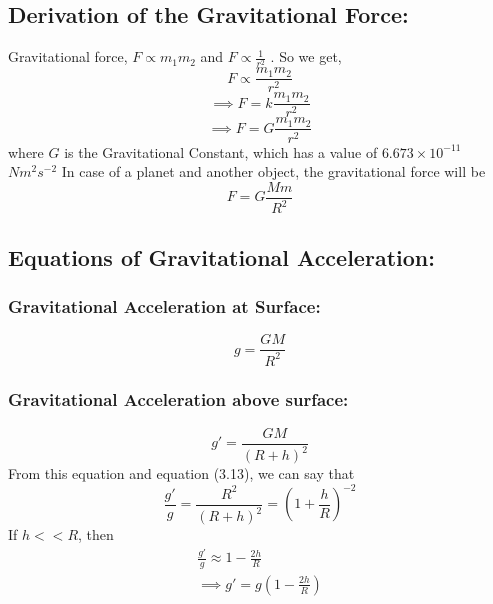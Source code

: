 \documentclass[a4paper]{report}
\begin{document}
        \subsection{Derivation of the Gravitational Force: }
            Gravitational force, $ F \propto m_1 m_2 $ and $ F \propto \frac{1}{r^2} $ . So we get,
            \[ F \propto \frac{m_1 m_2}{r^2} \]
            \[ \implies  F = k \frac{m_1 m_2}{r^2} \]
            \begin{equation}
               \implies  F = G \frac{m_1 m_2}{r^2} 
            \end{equation}
            where $G$ is the Gravitational Constant, which has a value of $ 6.673 \times 10^{-11}$ $N m^2 s^{-2} $
            In case of a planet and another object, the gravitational force will be
            \begin{equation}
                F = G \frac{M m}{R^2}
            \end{equation}
        
        \subsection{Equations of Gravitational Acceleration: }
            \subsubsection{Gravitational Acceleration at Surface: }
                \begin{equation}
                    g = \frac{GM}{R^2}
                \end{equation}
            \subsubsection{Gravitational Acceleration above surface: }
                \begin{equation}
                    g' = \frac{GM}{(R+h)^2}
                \end{equation}
                From this equation and equation (3.13), we can say that %
                \begin{equation}
                    \frac{g'}{g} = \frac{R^2}{(R+h)^2} = (1 + \frac{h}{R})^{-2}
                \end{equation}
                If $h << R$, then
                \begin{align}
                    \frac{g'}{g} \approx 1 - \frac{2h}{R} \nonumber \\
                    \implies g' = g (1-\frac{2h}{R})
                \end{align}
\end{document}

